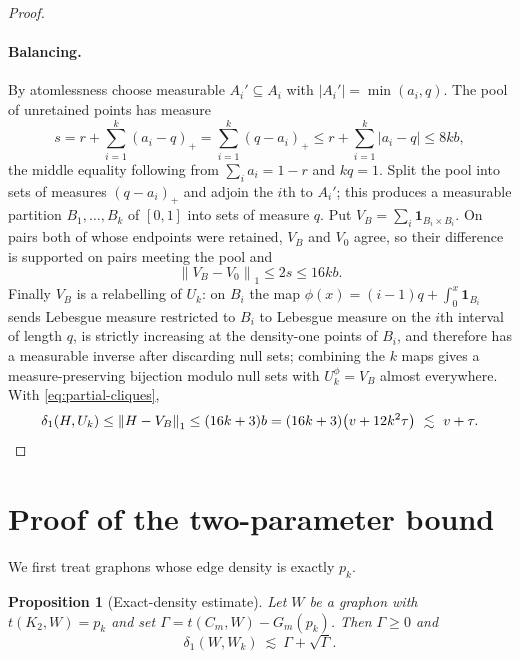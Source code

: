 \documentclass[11pt]{article}
\newtheorem{proposition}[theorem]{Proposition}
\theoremstyle{remark}
\newcommand{\ind}{\mathbf{1}}
\newcommand{\norm}[1]{\left\lVert #1\right\rVert}
\newcommand{\abs}[1]{\left\lvert #1\right\rvert}
\begin{document}
\begin{proof}
\paragraph{Balancing.}
By atomlessness choose measurable $A_i'\subseteq A_i$ with
$\abs{A_i'}=\min(a_i,q)$. The pool of unretained points has measure
\[
 s=r+\sum_{i=1}^k(a_i-q)_+=\sum_{i=1}^k(q-a_i)_+
 \leq r+\sum_{i=1}^k\abs{a_i-q}\leq8kb,
\]
the middle equality following from $\sum_ia_i=1-r$ and $kq=1$. Split the
pool into sets of measures $(q-a_i)_+$ and adjoin the $i$th to $A_i'$;
this produces a measurable partition $B_1,\ldots,B_k$ of $[0,1]$ into
sets of measure $q$. Put $V_B=\sum_i\ind_{B_i\times B_i}$. On pairs both
of whose endpoints were retained, $V_B$ and $V_0$ agree, so their
difference is supported on pairs meeting the pool and
\[
 \norm{V_B-V_0}_1\leq2s\leq16kb .
\]
Finally $V_B$ is a relabelling of $U_k$: on $B_i$ the map
$\phi(x)=(i-1)q+\int_0^x\ind_{B_i}$ sends Lebesgue measure restricted to
$B_i$ to Lebesgue measure on the $i$th interval of length $q$, is
strictly increasing at the density-one points of $B_i$, and therefore
has a measurable inverse after discarding null sets; combining the $k$
maps gives a measure-preserving bijection modulo null sets with
$U_k^\phi=V_B$ almost everywhere. With \eqref{eq:partial-cliques},
\[
 \delta_1(H,U_k)\leq\norm{H-V_B}_1\leq(16k+3)b
 =(16k+3)\bigl(v+12k^2\tau\bigr)\ \lesssim\ v+\tau. \qedhere
\]
\end{proof}

\section{Proof of the two-parameter bound}
\label{sec:completion}

We first treat graphons whose edge density is exactly $p_k$.

\begin{proposition}[Exact-density estimate]\label{prop:exact}
Let $W$ be a graphon with $t(K_2,W)=p_k$ and set
$\Gamma=t(C_m,W)-G_m(p_k)$. Then $\Gamma\geq0$ and
\begin{equation}\label{eq:exact-estimate}
 \delta_1(W,W_k)\ \lesssim\ \Gamma+\sqrt{\Gamma}.
\end{equation}
\end{proposition}
\end{document}
